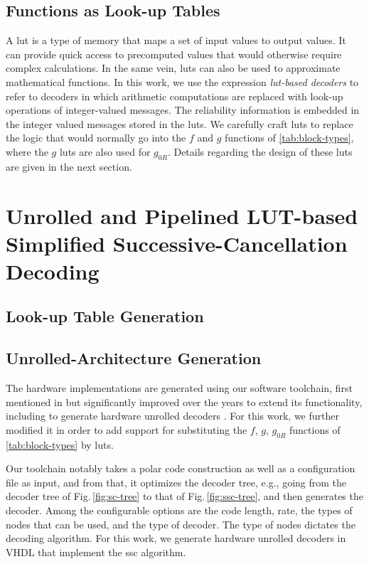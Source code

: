 \documentclass[conference,letterpaper]{IEEEtran}
\begin{document}
\subsection{Functions as Look-up Tables}\label{sec:bg:lut}
A \gls{lut} is a type of memory that maps a set of input values to output values. It can provide quick access to precomputed values that would otherwise require complex calculations. In the same vein, \glspl{lut} can also be used to approximate mathematical functions.  
In this work, we use the expression \emph{\gls{lut}-based decoders} to refer to decoders in which arithmetic computations are replaced with look-up operations of integer-valued messages\cite{shah_coarsely_2019,Koike-Akino2019}. 
The reliability information is embedded in the integer valued messages stored in the \glspl{lut}. We carefully craft \glspl{lut} to replace the logic that would normally go into the $f$ and $g$ functions of \autoref{tab:block-types}, where the $g$ \glspl{lut} are also used for $g_{0R}$. Details regarding the design of these \glspl{lut} are given in the next section.

\section{Unrolled and Pipelined LUT-based Simplified Successive-Cancellation Decoding}\label{sec:gen}
\subsection{Look-up Table Generation}\label{sec:gen:lut}


\subsection{Unrolled-Architecture Generation}\label{sec:gen:unrolled}
The hardware implementations are generated using our software toolchain, first mentioned in \cite{Sarkis2014a} but significantly improved over the years to extend its functionality, including to generate hardware unrolled decoders \cite{Giard_TCASI_2016}. For this work, we further modified it in order to add support for substituting the $f$, $g$, $g_{0R}$ functions of \autoref{tab:block-types} by \glspl{lut}.

Our toolchain notably takes a polar code construction as well as a configuration file as input, and from that, it optimizes the decoder tree, e.g., going from the decoder tree of Fig.\,\ref{fig:sc-tree} to that of Fig.\,\ref{fig:ssc-tree}, and then generates the decoder. Among the configurable options are the code length, rate, the types of nodes that can be used, and the type of decoder. The type of nodes dictates the decoding algorithm. For this work, we generate hardware unrolled decoders in VHDL that implement the \gls{ssc} algorithm.
\end{document}
